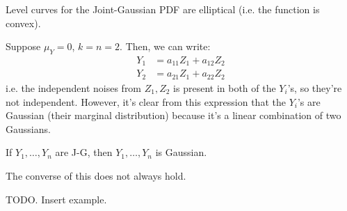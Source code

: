 \begin{note}
    Level curves for the Joint-Gaussian PDF are elliptical (i.e. the function is convex).
\end{note}

\begin{example}[2-Dimensional J-Gs]
    Suppose $\mu_Y = 0$, $k = n = 2$. Then, we can write:
    \begin{align*}
        Y_1 &= a_{11} Z_1 + a_{12} Z_2 \\
        Y_2 &= a_{21} Z_1 + a_{22} Z_2
    \end{align*}
    i.e. the independent noises from $Z_1, Z_2$ is present in both of the $Y_i$'s, so they're not independent.
    However, it's clear from this expression that the $Y_i$'s are Gaussian (their marginal distribution) because it's a linear combination of two Gaussians.
\end{example}

\begin{theorem}
    If $Y_1, \dots, Y_n$ are J-G, then $Y_1, \dots, Y_n$ is Gaussian.
\end{theorem}

The converse of this does not always hold.

\begin{example}
    TODO. Insert example.
\end{example}